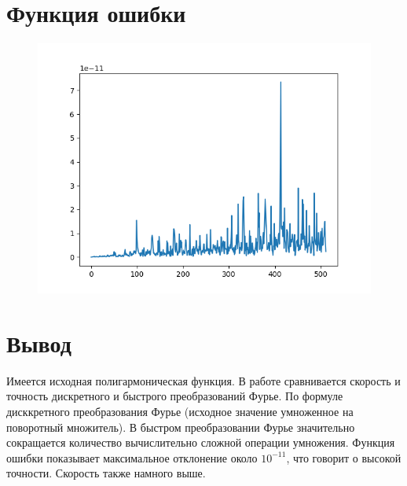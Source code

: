 \documentclass[12pt]{article}
\begin{document}
\section{Функция ошибки}
\begin{figure}[htp]
\centering
\includegraphics[scale=1.00]{err.png}
\caption{}
\label{}
\end{figure}

\section{Вывод}
Имеется исходная полигармоническая функция. В работе сравнивается скорость и точность дискретного и быстрого преобразований Фурье. По формуле дисккретного преобразования Фурье (исходное значение умноженное на поворотный множитель). В быстром преобразовании Фурье значительно сокращается количество вычислительно сложной операции умножения. Функция ошибки показывает максимальное отклонение около $10^{-11}$, что говорит о высокой точности. Скорость также намного выше.
\end{document}
